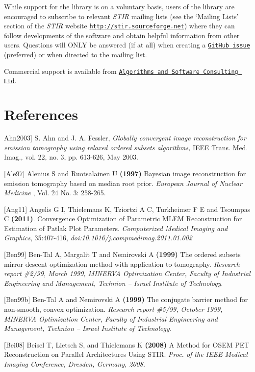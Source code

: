\documentclass{article}
\def\url#1#2{\mbox{\href{#1}{\tt #2}}}
\newcommand{\tab}{\hspace{5mm}}
\begin{document}
{{{{{{While support for the library is on a voluntary basis, users 
of the library are encouraged to subscribe to relevant \textit{STIR} 
mailing lists (see the `Mailing Lists' section of the \textit{STIR} website 
\url{http://stir.sourceforge.net/ }{http://stir.sourceforge.net}) 
where they can follow developments of the software and obtain 
helpful information from other users. Questions will ONLY be 
answered (if at all) when creating a \url{https://github.com/UCL/STIR/issues}{GitHub issue} (preferred) or
when directed to the mailing list.

Commercial support is available from \url{http://asc.uk.com}{Algorithms and
Software Consulting Ltd}.




\section{
References}

\tab {[}Ahn2003] S. Ahn and J. A. Fessler, \textit{Globally convergent image reconstruction for
emission tomography using relaxed ordered subsets algorithms,} IEEE
Trans. Med. Imag., vol. 22, no. 3, pp. 613-626, May 2003.

{[}Ale97] Alenius S and Ruotsalainen U \textbf{(1997)} Bayesian image 
reconstruction for emission tomography based on median root prior. \textit{European 
Journal of Nuclear Medicine} , Vol. 24 No. 3: 258-265.

{[}Ang11] Angelis G I, Thielemans K, Tziortzi A C, Turkheimer F E and Tsoumpas C  
\textbf{(2011)}. Convergence Optimization of Parametric MLEM Reconstruction for Estimation of Patlak Plot Parameters.  
\textit{Computerized Medical Imaging and Graphics}, 35:407-416,  
\textit{doi:10.1016/j.compmedimag.2011.01.002}

{[}Ben99] Ben-Tal A, Margalit T and Nemirovski A \textbf{(1999)} The 
ordered subsets mirror descent optimization method with application 
to tomography. \textit{Research report \#2/99, March 1999, MINERVA 
Optimization Center, Faculty of Industrial Engineering and Management, 
Technion -- Israel Institute of Technology}.

{[}Ben99b] Ben-Tal A and Nemirovski A \textbf{(1999)} The conjugate 
barrier method for non-smooth, convex optimization. \textit{Research 
report \#5/99, October 1999, MINERVA Optimization Center, Faculty 
of Industrial Engineering and Management, Technion -- Israel Institute 
of Technology.}

[Bei08] Beisel T, Lietsch S, and Thielemans K \textbf{(2008)}
A Method for OSEM PET Reconstruction on Parallel Architectures Using STIR.
\textit{Proc. of the IEEE Medical Imaging Conference, Dresden, Germany, 2008}.

}}}}}}
\end{document}
